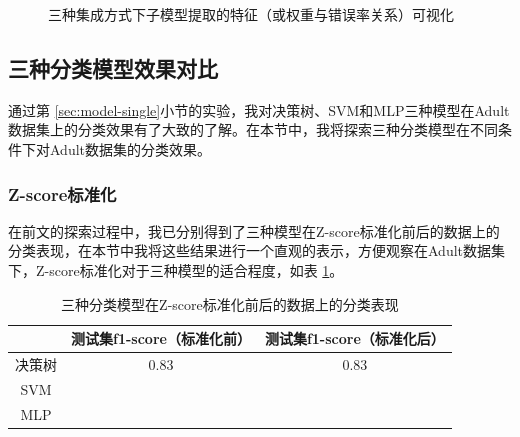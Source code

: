 \documentclass[12pt,a4paper]{article}
\theoremstyle{definition}
\begin{document}
\begin{figure}[H]
	\centering
	\caption{三种集成方式下子模型提取的特征（或权重与错误率关系）可视化}
	\label{fig:model-plus2}
\end{figure}

\subsection{三种分类模型效果对比}
\label{sec:compare}

通过第 \ref{sec:model-single}小节的实验，我对决策树、SVM和MLP三种模型在Adult数据集上的分类效果有了大致的了解。在本节中，我将探索三种分类模型在不同条件下对Adult数据集的分类效果。

\subsubsection{Z-score标准化}

在前文的探索过程中，我已分别得到了三种模型在Z-score标准化前后的数据上的分类表现，在本节中我将这些结果进行一个直观的表示，方便观察在Adult数据集下，Z-score标准化对于三种模型的适合程度，如表 \ref{tab:norm}。

\begin{table}[H]
	\renewcommand\arraystretch{1.35}
	\caption{三种分类模型在Z-score标准化前后的数据上的分类表现}
	\label{tab:norm}
	\centering
	
	\begin{tabular}{c|c|c}
		\centering
		 & 测试集f1-score（标准化前） & 测试集f1-score（标准化后） \\
		\hline
		\hline
		
		决策树 & 0.83 & 0.83 \\
		SVM & & \\
		MLP & & \\	

	\end{tabular}
\end{table}
\end{document}
